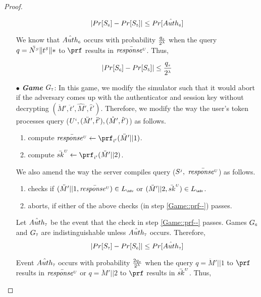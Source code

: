 \begin{proof}
\begin{itemize}
$$|Pr[S_{\scriptscriptstyle  6}]-Pr[S_{\scriptscriptstyle  5}]|\leq Pr[\hat {Auth}_{\scriptscriptstyle  6}]$$


We know that $\hat {Auth}_{\scriptscriptstyle  6}$ occurs with probability $ \frac{q_{\scriptscriptstyle  s}}{2^{\scriptscriptstyle \lambda}}$ when the query $q=\ddot{{N}^{\scriptscriptstyle S}}  \| {t}^{\scriptscriptstyle S} \| *$ to $\prf$ results in $\bar{\mathit{response}^{\scriptscriptstyle U}}$. Thus, 

\begin{equation}\label{eq::game_6}
|Pr[S_{\scriptscriptstyle  6}]-Pr[S_{\scriptscriptstyle  5}]|\leq \frac{q_{\scriptscriptstyle  s}}{2^{\scriptscriptstyle \lambda}}
\end{equation}

\item[$\bullet$] \textit{\textbf{Game}}  $G_{\scriptscriptstyle  7}$: In this game, we modify the simulator such that it would abort if the adversary comes up with the authenticator and session key without decrypting  $ (\ddot M', \ddot t', \hat M', \hat t')$.  Therefore, we modify the way the user's token processes query \send($U^{\scriptscriptstyle  i}, (\ddot M', \ddot t'), (\hat M', \hat t')$) as follows.
 \begin{enumerate}
 \item compute $\bar{\VC{\mathit{response}}} \gets \prf_{\sss  \ddot t'}( \ddot M'|| 1)$.
 \item compute $\bar {sk}^{\sss U}\gets \prf_{\sss  \ddot t'}( \ddot M'|| 2)$.
 \end{enumerate}

We also amend the way the server compiles query \send($S^{\scriptscriptstyle  j},  $ $ \bar{\mathit{response}^{\scriptscriptstyle U}}$) as follows. 
%
\begin{enumerate}[label=\alph*]
%
\item\label{Game::prf--}  checks if  $(\ddot M'||1, \bar{\VC{\mathit{response}}})\in L_{\sss \adv}$ or  $(\ddot M'||2, \bar {sk}^{\sss U})\in L_{\sss \adv}$. 
%
\item aborts, if either of the above checks (in step \ref{Game::prf--}) passes.
%
\end{enumerate}



 Let $\hat {Auth}_{\scriptscriptstyle  7}$ be the event that the check in step \ref{Game::prf--} passes. Games $G_{\scriptscriptstyle  6}$ and $G_{\scriptscriptstyle 7}$ are indistinguishable unless $\hat {Auth}_{\scriptscriptstyle  7}$ occurs. Therefore,
%
$$|Pr[S_{\scriptscriptstyle  7}]-Pr[S_{\scriptscriptstyle  6}]|\leq Pr[\hat {Auth}_{\scriptscriptstyle  7}]$$


Event $\hat {Auth}_{\scriptscriptstyle  7}$ occurs with probability $ \frac{2q_{\scriptscriptstyle  s}}{2^{\scriptscriptstyle \lambda}}$ when the query $q=\ddot M'||1$ to $\prf$ results in $\bar{\mathit{response}^{\scriptscriptstyle U}}$ or $q=\ddot M'||2$ to $\prf$ results in $\bar {sk}^{\scriptscriptstyle U}$. Thus, 


\end{itemize}
\end{proof}

